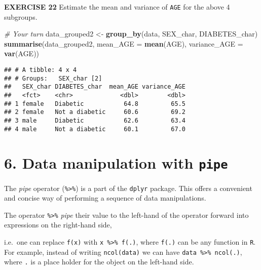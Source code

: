 \documentclass[
]{article}
\newenvironment{Shaded}{\begin{snugshade}}{\end{snugshade}}
\newcommand{\CommentTok}[1]{\textcolor[rgb]{0.56,0.35,0.01}{\textit{#1}}}
\newcommand{\DataTypeTok}[1]{\textcolor[rgb]{0.13,0.29,0.53}{#1}}
\newcommand{\KeywordTok}[1]{\textcolor[rgb]{0.13,0.29,0.53}{\textbf{#1}}}
\newcommand{\NormalTok}[1]{#1}
\newcommand{\OperatorTok}[1]{\textcolor[rgb]{0.81,0.36,0.00}{\textbf{#1}}}
\newcommand{\StringTok}[1]{\textcolor[rgb]{0.31,0.60,0.02}{#1}}
\begin{document}
\textbf{EXERCISE 22} Estimate the mean and variance of \texttt{AGE} for
the above 4 subgroups.

\begin{Shaded}
\begin{Highlighting}[]
\CommentTok{# Your turn}
\NormalTok{data_grouped2 <-}\StringTok{ }\KeywordTok{group_by}\NormalTok{(data, SEX_char, DIABETES_char)}
\KeywordTok{summarise}\NormalTok{(data_grouped2, }\DataTypeTok{mean_AGE =} \KeywordTok{mean}\NormalTok{(AGE), }
          \DataTypeTok{variance_AGE =} \KeywordTok{var}\NormalTok{(AGE))}
\end{Highlighting}
\end{Shaded}

\begin{verbatim}
## # A tibble: 4 x 4
## # Groups:   SEX_char [2]
##   SEX_char DIABETES_char  mean_AGE variance_AGE
##   <fct>    <chr>             <dbl>        <dbl>
## 1 female   Diabetic           64.8         65.5
## 2 female   Not a diabetic     60.6         69.2
## 3 male     Diabetic           62.6         63.4
## 4 male     Not a diabetic     60.1         67.0
\end{verbatim}

\hypertarget{data-manipulation-with-pipe}{%
\section{\texorpdfstring{6. Data manipulation with
\texttt{pipe}}{6. Data manipulation with pipe}}\label{data-manipulation-with-pipe}}

The \emph{pipe} operator (\texttt{\%\textgreater{}\%}) is a part of the
\texttt{dplyr} package. This offers a convenient and concise way of
performing a sequence of data manipulations.

The operator \texttt{\%\textgreater{}\%} \emph{pipe} their value to the
left-hand of the operator forward into expressions on the right-hand
side,

i.e.~one can replace \texttt{f(x)} with
\texttt{x\ \%\textgreater{}\%\ f(.)}, where \texttt{f(.)} can be any
function in \texttt{R}. For example, instead of writing
\texttt{ncol(data)} we can have
\texttt{data\ \%\textgreater{}\%\ ncol(.)}, where \texttt{.} is a place
holder for the object on the left-hand side.

\begin{Shaded}
\end{Shaded}
\end{document}
